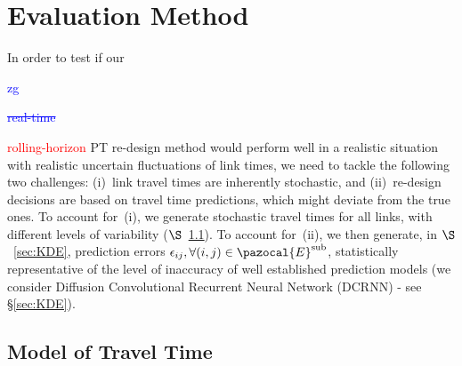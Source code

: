 \documentclass[a4paper,fleqn]{cas-sc}
\newcommand{\stkout}[1]{\ifmmode\text{\sout{\ensuremath{#1}}}\else\sout{#1}\fi}
\newcommand\rev[3]{\textcolor{blue}{\begin{scriptsize}{#1}\end{scriptsize}\stkout{#2}}\textcolor{red}{#3}}
\newcommand\rev[3]{\ignorespaces#3\ignorespaces\unskip}
\begin{document}


\section{Evaluation Method}\label{sec:evaMETHO}
%
In order to test if our \rev{zg}{real-time}{rolling-horizon} PT re-design method would perform well in a realistic situation with realistic uncertain fluctuations of link times, we need to tackle the following two challenges: (i)~link travel times are inherently stochastic, and (ii)~re-design decisions are based on travel time predictions, which might deviate from the true ones. To account for~(i), we generate stochastic travel times for all links, with different levels of variability ($\S$~\ref{sec:log_normal}). To account for~(ii), we then generate, in $\S$~\ref{sec:KDE}, prediction errors $\epsilon_{ij}, \forall (i,j) \in \pazocal{E}^{\text{sub}}$, statistically representative of the level of inaccuracy of well established prediction models (we consider Diffusion Convolutional Recurrent Neural Network (DCRNN) - see \S{}\ref{sec:KDE}). 

\subsection{Model of Travel Time}
\label{sec:log_normal}
\end{document}

